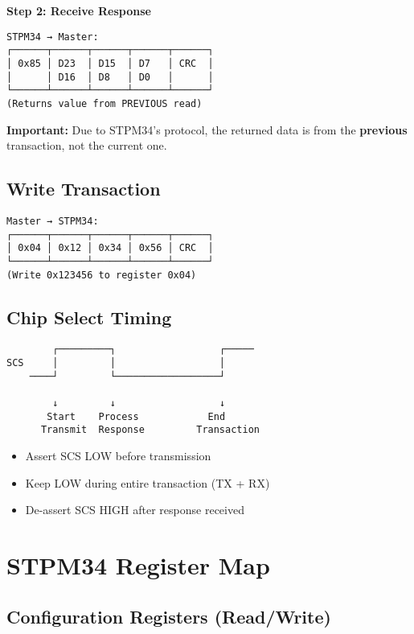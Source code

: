 \documentclass[11pt,a4paper]{article}
\begin{document}
\textbf{Step 2: Receive Response}
\begin{verbatim}
STPM34 → Master:
┌──────┬──────┬──────┬──────┬──────┐
│ 0x85 │ D23  │ D15  │ D7   │ CRC  │
│      │ D16  │ D8   │ D0   │      │
└──────┴──────┴──────┴──────┴──────┘
(Returns value from PREVIOUS read)
\end{verbatim}

\textbf{Important:} Due to STPM34's protocol, the returned data is from the \textbf{previous} transaction, not the current one.

\subsection{Write Transaction}

\begin{verbatim}
Master → STPM34:
┌──────┬──────┬──────┬──────┬──────┐
│ 0x04 │ 0x12 │ 0x34 │ 0x56 │ CRC  │
└──────┴──────┴──────┴──────┴──────┘
(Write 0x123456 to register 0x04)
\end{verbatim}

\subsection{Chip Select Timing}

\begin{verbatim}
        ┌─────────┐                  ┌─────
SCS     │         │                  │
    ────┘         └──────────────────┘

        ↓         ↓                  ↓
       Start    Process            End
      Transmit  Response         Transaction
\end{verbatim}

\begin{itemize}[noitemsep]
    \item Assert SCS LOW before transmission
    \item Keep LOW during entire transaction (TX + RX)
    \item De-assert SCS HIGH after response received
\end{itemize}

\section{STPM34 Register Map}

\subsection{Configuration Registers (Read/Write)}
\end{document}

